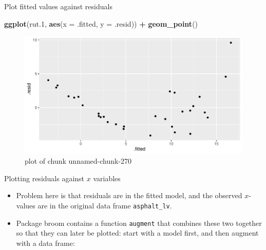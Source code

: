 \documentclass[ignorenonframetext,]{beamer}
\newenvironment{Shaded}{\begin{snugshade}}{\end{snugshade}}
\newcommand{\DataTypeTok}[1]{\textcolor[rgb]{0.13,0.29,0.53}{#1}}
\newcommand{\FloatTok}[1]{\textcolor[rgb]{0.00,0.00,0.81}{#1}}
\newcommand{\KeywordTok}[1]{\textcolor[rgb]{0.13,0.29,0.53}{\textbf{#1}}}
\newcommand{\NormalTok}[1]{#1}
\newcommand{\OperatorTok}[1]{\textcolor[rgb]{0.81,0.36,0.00}{\textbf{#1}}}
\newcommand{\StringTok}[1]{\textcolor[rgb]{0.31,0.60,0.02}{#1}}
\providecommand{\tightlist}{%
  \setlength{\itemsep}{0pt}\setlength{\parskip}{0pt}}
\begin{document}
\begin{frame}[fragile]{Plot fitted values against residuals}
\protect\hypertarget{plot-fitted-values-against-residuals}{}

\begin{Shaded}
\begin{Highlighting}[]
\KeywordTok{ggplot}\NormalTok{(rut}\FloatTok{.1}\NormalTok{, }\KeywordTok{aes}\NormalTok{(}\DataTypeTok{x =}\NormalTok{ .fitted, }\DataTypeTok{y =}\NormalTok{ .resid)) }\OperatorTok{+}\StringTok{ }\KeywordTok{geom_point}\NormalTok{()}
\end{Highlighting}
\end{Shaded}

\begin{figure}
\centering
\includegraphics{figure/unnamed-chunk-270-1.pdf}
\caption{plot of chunk unnamed-chunk-270}
\end{figure}

\end{frame}

\begin{frame}[fragile]{Plotting residuals against \(x\) variables}
\protect\hypertarget{plotting-residuals-against-x-variables}{}

\begin{itemize}
\tightlist
\item
  Problem here is that residuals are in the fitted model, and the
  observed \(x\)-values are in the original data frame
  \texttt{asphalt\_lv}.
\item
  Package broom contains a function \texttt{augment} that combines these
  two together so that they can later be plotted: start with a model
  first, and then augment with a data frame:
\end{itemize}

\begin{Shaded}
\end{Shaded}

\end{frame}
\end{document}

